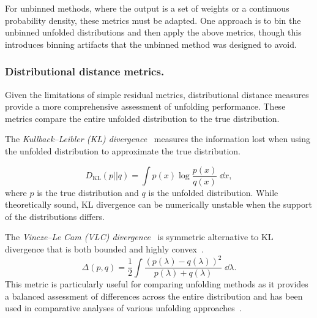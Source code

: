             For unbinned methods, where the output is a set of weights or a continuous probability density, these metrics must be adapted.
            One approach is to bin the unbinned unfolded distributions and then apply the above metrics, though this introduces binning artifacts that the unbinned method was designed to avoid.

        \subsubsection{Distributional distance metrics.}
        \label{subsubsec:distributional-distance-metrics}
            Given the limitations of simple residual metrics, distributional distance measures provide a more comprehensive assessment of unfolding performance.
            These metrics compare the entire unfolded distribution to the true distribution.

            The \emph{Kullback--Leibler (KL) divergence}~\cite{kullback_information_1951} measures the information lost when using the unfolded distribution to approximate the true distribution.
            
            \begin{equation}
            D_{\text{KL}}(p||q) = \int p(x) \log \frac{p(x)}{q(x)} \;\dd x,
            \end{equation}
            where \(p\) is the true distribution and
            \(q\) is the unfolded distribution.
            While theoretically sound, KL divergence can be numerically unstable when the support of the distributions differs.
            
            The \emph{Vincze--Le Cam (VLC) divergence}~\cite{vincze_concept_1981,Cam1986AsymptoticTheory} is symmetric alternative to KL divergence that is both bounded and highly convex~\cite{melbourne_strongly_2020}.
            \begin{equation}
                \Delta(p, q) = \frac{1}{2}\int \frac{(p(\lambda) - q(\lambda))^2}{p(\lambda) + q(\lambda)} \;\dd\lambda.
            \end{equation}
            This metric is particularly useful for comparing unfolding methods as it provides a balanced assessment of differences across the entire distribution and has been used in comparative analyses of various unfolding approaches~\cite{andreassen_omnifold_2020, komiske_preserving_2021}.

